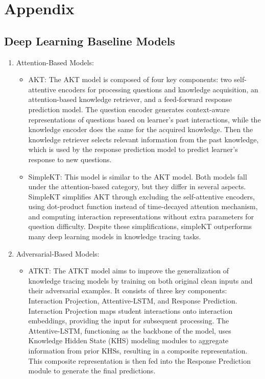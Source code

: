 

\section{Appendix}

\subsection{Deep Learning Baseline Models}
\label{appendix: deep learning baseline}

\begin{enumerate}
    \item Attention-Based Models: 
    \begin{itemize}
        \item AKT: The AKT model is composed of four key components: two self-attentive encoders for processing questions and knowledge acquisition, an attention-based knowledge retriever, and a feed-forward response prediction model. The question encoder generates context-aware representations of questions based on learner's past interactions, while the knowledge encoder does the same for the acquired knowledge. Then the knowledge retriever selects relevant information from the past knowledge, which is used by the response prediction model to predict learner's response to new questions\cite{10.1145/3394486.3403282}.
        \item SimpleKT: This model is similar to the AKT model. Both models fall under the attention-based category, but they differ in several aspects. SimpleKT simplifies AKT through excluding the self-attentive encoders, using dot-product function instead of time-decayed attention mechanism, and computing interaction representations without extra parameters for question difficulty. Despite these simplifications, simpleKT outperforms many deep learning models in knowledge tracing tasks\cite{DBLP:conf/iclr/0001L0H023}. 
    \end{itemize}

    \item Adversarial-Based Models:
    \begin{itemize}
        \item ATKT: The ATKT model aims to improve the generalization of knowledge tracing models by training on both original clean inputs and their adversarial examples. It consists of three key components: Interaction Projection, Attentive-LSTM, and Response Prediction. Interaction Projection maps student interactions onto interaction embeddings, providing the input for subsequent processing. The Attentive-LSTM, functioning as the backbone of the model, uses Knowledge Hidden State (KHS) modeling modules to aggregate information from prior KHSs, resulting in a composite representation. This composite representation is then fed into the Response Prediction module to generate the final predictions\cite{10.1145/3474085.3475554}.
    \end{itemize}


\end{enumerate}
